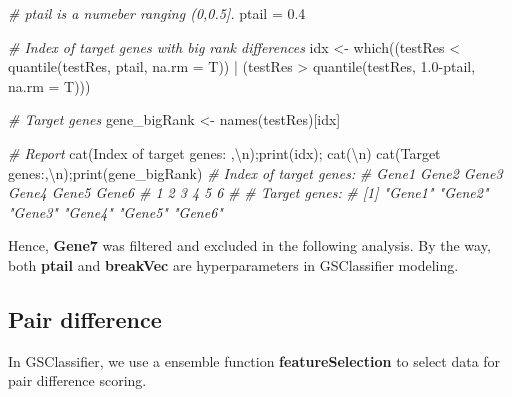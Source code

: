 \documentclass[
  12pt,
]{book}
\newenvironment{Shaded}{\begin{snugshade}}{\end{snugshade}}
\newcommand{\AttributeTok}[1]{\textcolor[rgb]{0.77,0.63,0.00}{#1}}
\newcommand{\CommentTok}[1]{\textcolor[rgb]{0.56,0.35,0.01}{\textit{#1}}}
\newcommand{\FloatTok}[1]{\textcolor[rgb]{0.00,0.00,0.81}{#1}}
\newcommand{\FunctionTok}[1]{\textcolor[rgb]{0.00,0.00,0.00}{#1}}
\newcommand{\NormalTok}[1]{#1}
\newcommand{\OtherTok}[1]{\textcolor[rgb]{0.56,0.35,0.01}{#1}}
\newcommand{\SpecialCharTok}[1]{\textcolor[rgb]{0.00,0.00,0.00}{#1}}
\newcommand{\StringTok}[1]{\textcolor[rgb]{0.31,0.60,0.02}{#1}}
\begin{document}
\begin{Shaded}
\begin{Highlighting}[]

\CommentTok{\# ptail is a numeber ranging (0,0.5].}
\NormalTok{ptail }\OtherTok{=} \FloatTok{0.4}

\CommentTok{\# Index of target genes with big rank differences}
\NormalTok{idx }\OtherTok{\textless{}{-}} \FunctionTok{which}\NormalTok{((testRes }\SpecialCharTok{\textless{}} \FunctionTok{quantile}\NormalTok{(testRes, ptail, }\AttributeTok{na.rm =}\NormalTok{ T)) }\SpecialCharTok{|} 
\NormalTok{             (testRes }\SpecialCharTok{\textgreater{}} \FunctionTok{quantile}\NormalTok{(testRes, }\FloatTok{1.0}\SpecialCharTok{{-}}\NormalTok{ptail, }\AttributeTok{na.rm =}\NormalTok{ T)))}

\CommentTok{\# Target genes}
\NormalTok{gene\_bigRank }\OtherTok{\textless{}{-}} \FunctionTok{names}\NormalTok{(testRes)[idx]}

\CommentTok{\# Report}
\FunctionTok{cat}\NormalTok{(}\StringTok{\textquotesingle{}Index of target genes: \textquotesingle{}}\NormalTok{,}\StringTok{\textquotesingle{}}\SpecialCharTok{\textbackslash{}n}\StringTok{\textquotesingle{}}\NormalTok{);}\FunctionTok{print}\NormalTok{(idx); }\FunctionTok{cat}\NormalTok{(}\StringTok{\textquotesingle{}}\SpecialCharTok{\textbackslash{}n}\StringTok{\textquotesingle{}}\NormalTok{)}
\FunctionTok{cat}\NormalTok{(}\StringTok{\textquotesingle{}Target genes:\textquotesingle{}}\NormalTok{,}\StringTok{\textquotesingle{}}\SpecialCharTok{\textbackslash{}n}\StringTok{\textquotesingle{}}\NormalTok{);}\FunctionTok{print}\NormalTok{(gene\_bigRank)}
\CommentTok{\# Index of target genes:  }
\CommentTok{\# Gene1 Gene2 Gene3 Gene4 Gene5 Gene6 }
\CommentTok{\#     1     2     3     4     5     6 }
\CommentTok{\# }
\CommentTok{\# Target genes: }
\CommentTok{\# [1] "Gene1" "Gene2" "Gene3" "Gene4" "Gene5" "Gene6"}
\end{Highlighting}
\end{Shaded}

Hence, \textbf{Gene7} was filtered and excluded in the following analysis. By the way, both \textbf{ptail} and \textbf{breakVec} are hyperparameters in GSClassifier modeling.

\hypertarget{pair-difference}{%
\subsection{Pair difference}\label{pair-difference}}

In GSClassifier, we use a ensemble function \textbf{featureSelection} to select data for pair difference scoring.
\end{document}

